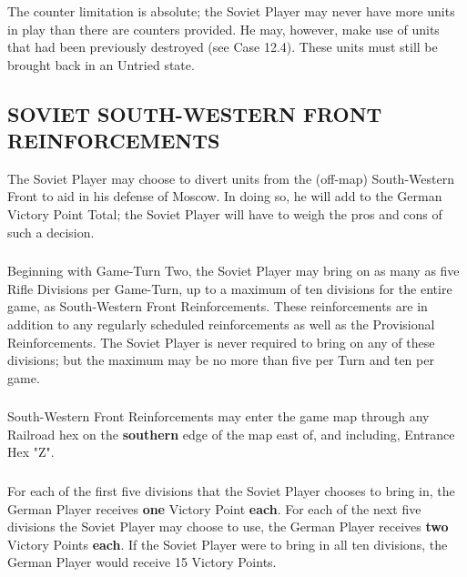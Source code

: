 \subsubsection{} The counter limitation is absolute; the Soviet Player may never have more units in play than there are counters provided. He may, however, make use of units that had been previously destroyed (see Case 12.4). These units must still be brought back in an Untried state.

\subsection{SOVIET SOUTH-WESTERN FRONT REINFORCEMENTS}

The Soviet Player may choose to divert units from the (off-map) South-Western Front to aid in his defense of Moscow. In doing so, he will add to the German Victory Point Total; the Soviet Player will have to weigh the pros and cons of such a decision.

\subsubsection{} Beginning with Game-Turn Two, the Soviet Player may bring on as many as five Rifle Divisions per Game-Turn, up to a maximum of ten divisions for the entire game, as South-Western Front Reinforcements. These reinforcements are in addition to any regularly scheduled reinforcements as well as the Provisional Reinforcements. The Soviet Player is never required to bring on any of these divisions; but the maximum may be no more than five per Turn and ten per game.

\subsubsection{} South-Western Front Reinforcements may enter the game map through any Railroad hex on the \textbf{southern} edge of the map east of, and including, Entrance Hex "Z".

\subsubsection{} For each of the first five divisions that the Soviet Player chooses to bring in, the German Player receives \textbf{one} Victory Point \textbf{each}. For each of the next five divisions the Soviet Player may choose to use, the German Player receives \textbf{two} Victory Points \textbf{each}. If the Soviet Player were to bring in all ten divisions, the German Player would receive 15 Victory Points.

